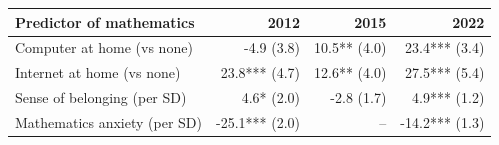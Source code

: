 \begin{tabular}{@{}lrrr@{}}
\toprule
Predictor of mathematics & 2012 & 2015 & 2022 \\
\midrule
Computer at home (vs none) & -4.9 (3.8) & 10.5** (4.0) & 23.4*** (3.4) \\
Internet at home (vs none) & 23.8*** (4.7) & 12.6** (4.0) & 27.5*** (5.4) \\
Sense of belonging (per SD) & 4.6* (2.0) & -2.8 (1.7) & 4.9*** (1.2) \\
Mathematics anxiety (per SD) & -25.1*** (2.0) & -- & -14.2*** (1.3) \\
\bottomrule
\end{tabular}
